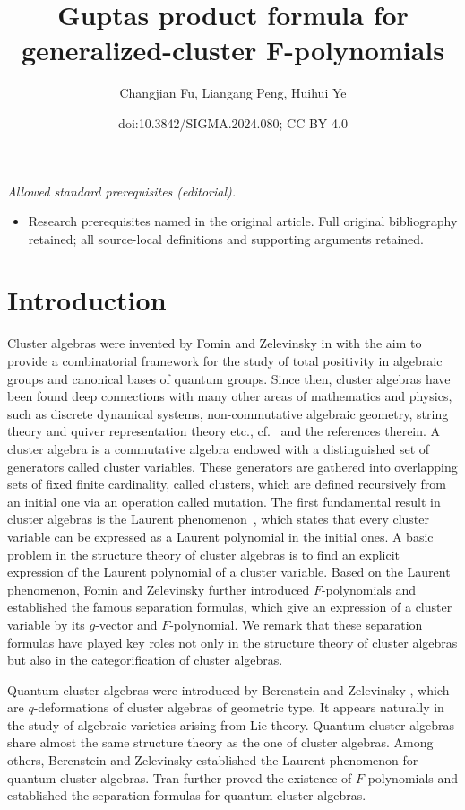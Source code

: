 \documentclass[10pt,a4paper]{amsart}
\title{Guptas product formula for generalized-cluster F-polynomials}
\author{Changjian Fu, Liangang Peng, Huihui Ye}
\date{doi:10.3842/SIGMA.2024.080; CC BY 4.0}
\numberwithin{equation}{section}
\begin{document}
\maketitle
\noindent\textit{Allowed standard prerequisites (editorial).}\begin{itemize}
\item Research prerequisites named in the original article. Full original bibliography retained; all source-local definitions and supporting arguments retained.
\end{itemize}\medskip
\section{Introduction}\label{S1}
Cluster algebras were invented by Fomin and Zelevinsky in \cite{fomin_zelevinsky_2002} with the aim to provide a combinatorial framework for the study of total positivity in algebraic groups and canonical bases of quantum groups. Since then, cluster algebras have been found deep connections with many other areas of mathematics and physics, such as discrete dynamical systems, non-commutative algebraic geometry, string theory and quiver representation theory etc., cf.\ \cite{Keller2012} and the references therein. A cluster algebra is a commutative algebra endowed with a distinguished set of generators called cluster variables. These generators are gathered into
overlapping sets of fixed finite cardinality, called clusters, which are defined recursively from an initial one via an operation called mutation. The first fundamental result in cluster algebras is the Laurent phenomenon~\cite{fomin_zelevinsky_2002}, which states that every cluster variable can be expressed as a Laurent polynomial in the initial ones. A basic problem in the structure theory of cluster algebras is to find an explicit expression of the Laurent polynomial of a cluster variable. Based on the Laurent phenomenon, Fomin and Zelevinsky \cite{fomin_zelevinsky_2007} further introduced $F$-polynomials and established the famous separation formulas, which give an expression of a cluster variable by its $g$-vector and $F$-polynomial. We remark that these separation formulas have played key roles not only in the structure theory of cluster algebras but also in the categorification of cluster algebras.

Quantum cluster algebras were introduced by Berenstein and Zelevinsky \cite{Berenstein_Zelevinsky2005}, which are $q$-deformations of cluster algebras of geometric type. It appears naturally in the study of algebraic varieties arising from Lie theory. Quantum cluster algebras share almost the same structure theory as the one of cluster algebras. Among others, Berenstein and Zelevinsky \cite{Berenstein_Zelevinsky2005} established the Laurent phenomenon for quantum cluster algebras. Tran \cite{Thao2011} further proved the existence of $F$-polynomials and established the separation formulas for quantum cluster algebras.
\end{document}
